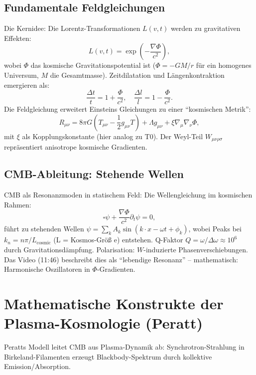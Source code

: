 	\subsection{Fundamentale Feldgleichungen}
	Die Kernidee: Die Lorentz-Transformationen $L(v,t)$ werden zu gravitativen Effekten:
	\begin{equation}
		L(v,t) = \exp\left( -\frac{\nabla \Phi}{c^2} \right),
	\end{equation}
	wobei $\Phi$ das kosmische Gravitationspotential ist ($\Phi = -GM/r$ für ein homogenes Universum, $M$ die Gesamtmasse). Zeitdilatation und Längenkontraktion emergieren als:
	\begin{equation}
		\frac{\Delta t}{t} = 1 + \frac{\Phi}{c^2}, \quad \frac{\Delta l}{l} = 1 - \frac{\Phi}{c^2}.
	\end{equation}
	Die Feldgleichung erweitert Einsteins Gleichungen zu einer ``kosmischen Metrik'':
	\begin{equation}
		R_{\mu\nu} = 8\pi G \left(T_{\mu\nu} - \frac{1}{2} g_{\mu\nu} T\right) + \Lambda g_{\mu\nu} + \xi \nabla_\mu \nabla_\nu \Phi,
	\end{equation}
	mit $\xi$ als Kopplungskonstante (hier analog zu T0). Der Weyl-Teil $W_{\mu\nu\rho\sigma}$ repräsentiert anisotrope kosmische Gradienten.
	\subsection{CMB-Ableitung: Stehende Wellen}
	CMB als Resonanzmoden in statischem Feld: Die Wellengleichung im kosmischen Rahmen:
	\begin{equation}
		\square \psi + \frac{\nabla \Phi}{c^2} \partial_t \psi = 0,
	\end{equation}
	führt zu stehenden Wellen $\psi = \sum_k A_k \sin(k \cdot x - \omega t + \phi_k)$, wobei Peaks bei $k_n = n \pi / L_{\text{cosmic}}$ (L = Kosmos-Größ e) entstehen. Q-Faktor $Q = \omega / \Delta \omega \approx 10^6$ durch Gravitationsdämpfung. Polarisation: $W$-induzierte Phasenverschiebungen.
	Das Video (11:46) beschreibt dies als ``lebendige Resonanz'' -- mathematisch: Harmonische Oszillatoren in $\Phi$-Gradienten.
	\section{Mathematische Konstrukte der Plasma-Kosmologie (Peratt)}
	Peratts Modell \cite{peratt1992} leitet CMB aus Plasma-Dynamik ab: Synchrotron-Strahlung in Birkeland-Filamenten erzeugt Blackbody-Spektrum durch kollektive Emission/Absorption.
